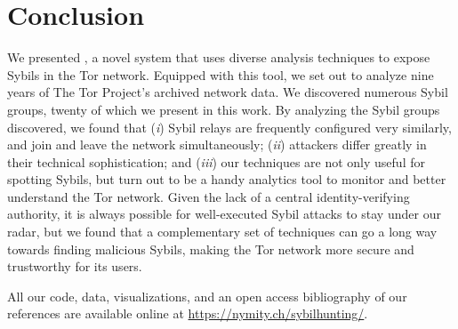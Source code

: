 \section{Conclusion}
\label{sec:conclusion}
We presented \sys, a novel system that uses diverse analysis techniques to
expose Sybils in the Tor network.  Equipped with this tool, we set out to
analyze nine years of The Tor Project's archived network data.  We discovered
numerous Sybil groups, twenty of which we present in this work.  By analyzing
the Sybil groups \sys discovered, we found that (\emph{i}) Sybil relays are
frequently configured very similarly, and join and leave the network
simultaneously; (\emph{ii}) attackers differ greatly in their technical
sophistication; and (\emph{iii}) our techniques are not only useful for
spotting Sybils, but turn out to be a handy analytics tool to monitor and
better understand the Tor network.  Given the lack of a central
identity-verifying authority, it is always possible for well-executed Sybil
attacks to stay under our radar, but we found that a complementary set of
techniques can go a long way towards finding malicious Sybils, making the Tor
network more secure and trustworthy for its users.

All our code, data, visualizations, and an open access bibliography of our
references are available online at \url{https://nymity.ch/sybilhunting/}.
